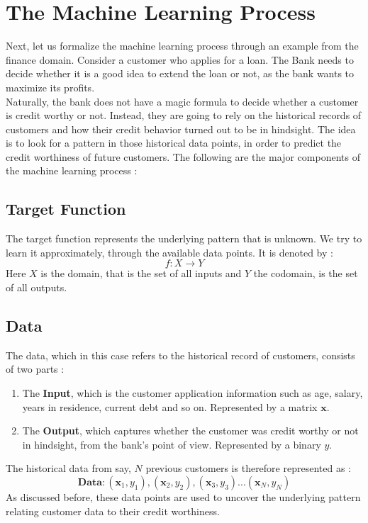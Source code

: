 \documentclass[12pt, letterpaper]{article}
\begin{document}
\section{The Machine Learning Process}
Next, let us formalize the machine learning process through an example from the finance domain. Consider a customer who applies for a loan. The Bank needs to decide whether it is a good idea to extend the loan or not, as the bank wants to maximize its profits.\\
Naturally, the bank does not have a magic formula to decide whether a customer is credit worthy or not. Instead, they are going to rely on the historical records of customers and how their credit behavior turned out to be in hindsight. The idea is to look for a pattern in those historical data points, in order to predict the credit worthiness of future customers. The following are the major components of the machine learning process :

\subsection{Target Function}
The target function represents the underlying pattern that is unknown. We try to learn it approximately, through the available data points. It is denoted by :
\begin{displaymath}
    f : X \rightarrow Y
\end{displaymath}
Here $X$ is the domain, that is the set of all inputs and $Y$ the codomain, is the set of all outputs. 

\subsection{Data}
The data, which in this case refers to the historical record of customers, consists of two parts :
\begin{enumerate}
    \item The \textbf{Input}, which is the customer application information such as age, salary, years in residence, current debt and so on. Represented by a matrix $\mathbf{x}$.
    \item The \textbf{Output}, which captures whether the customer was credit worthy or not in hindsight, from the bank's point of view. Represented by a binary $y$.
\end{enumerate}
The historical data from say, $N$ previous customers is therefore represented as : 
\begin{displaymath}
    \textbf{Data} : (\mathbf{x}_1,y_1), (\mathbf{x}_2,y_2), (\mathbf{x}_3,y_3)...(\mathbf{x}_N, y_N)
\end{displaymath}
As discussed before, these data points are used to uncover the underlying pattern relating customer data to their credit worthiness. 
\end{document}
